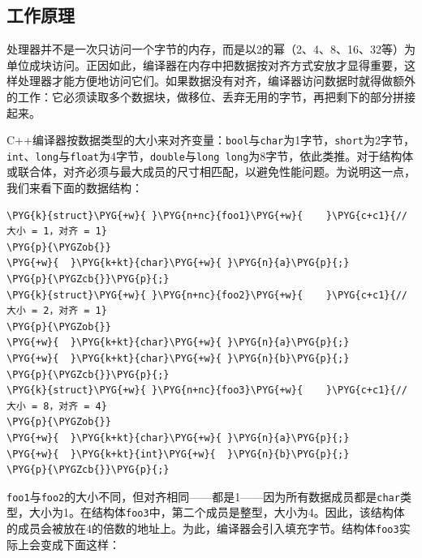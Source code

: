 
\subsection{工作原理}



处理器并不是一次只访问一个字节的内存，而是以2的幂（2、4、8、16、32等）为单位成块访问。正因如此，编译器在内存中把数据按对齐方式安放才显得重要，这样处理器才能方便地访问它们。如果数据没有对齐，编译器访问数据时就得做额外的工作：它必须读取多个数据块，做移位、丢弃无用的字节，再把剩下的部分拼接起来。



C++编译器按数据类型的大小来对齐变量：\texttt{bool}与\texttt{char}为1字节，\texttt{short}为2字节，\texttt{int}、\texttt{long}与\texttt{float}为4字节，\texttt{double}与\texttt{long long}为8字节，依此类推。对于结构体或联合体，对齐必须与最大成员的尺寸相匹配，以避免性能问题。为说明这一点，我们来看下面的数据结构：



\begin{codeblockbg}
\begin{Verbatim}[commandchars=\\\{\},breaklines=true,breakanywhere=true,fontsize=\codefont,xleftmargin=17bp]
\PYG{k}{struct}\PYG{+w}{ }\PYG{n+nc}{foo1}\PYG{+w}{    }\PYG{c+c1}{// 大小 = 1，对齐 = 1}
\PYG{p}{\PYGZob{}}
\PYG{+w}{  }\PYG{k+kt}{char}\PYG{+w}{ }\PYG{n}{a}\PYG{p}{;}
\PYG{p}{\PYGZcb{}}\PYG{p}{;}
\PYG{k}{struct}\PYG{+w}{ }\PYG{n+nc}{foo2}\PYG{+w}{    }\PYG{c+c1}{// 大小 = 2，对齐 = 1}
\PYG{p}{\PYGZob{}}
\PYG{+w}{  }\PYG{k+kt}{char}\PYG{+w}{ }\PYG{n}{a}\PYG{p}{;}
\PYG{+w}{  }\PYG{k+kt}{char}\PYG{+w}{ }\PYG{n}{b}\PYG{p}{;}
\PYG{p}{\PYGZcb{}}\PYG{p}{;}
\PYG{k}{struct}\PYG{+w}{ }\PYG{n+nc}{foo3}\PYG{+w}{    }\PYG{c+c1}{// 大小 = 8，对齐 = 4}
\PYG{p}{\PYGZob{}}
\PYG{+w}{  }\PYG{k+kt}{char}\PYG{+w}{ }\PYG{n}{a}\PYG{p}{;}
\PYG{+w}{  }\PYG{k+kt}{int}\PYG{+w}{  }\PYG{n}{b}\PYG{p}{;}
\PYG{p}{\PYGZcb{}}\PYG{p}{;}
\end{Verbatim}
\end{codeblockbg}



\texttt{foo1}与\texttt{foo2}的大小不同，但对齐相同——都是1——因为所有数据成员都是\texttt{char}类型，大小为1。在结构体\texttt{foo3}中，第二个成员是整型，大小为4。因此，该结构体的成员会被放在4的倍数的地址上。为此，编译器会引入填充字节。结构体\texttt{foo3}实际上会变成下面这样：


